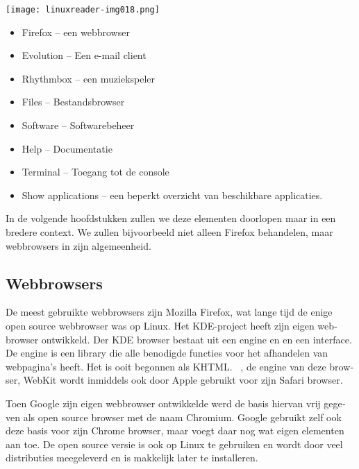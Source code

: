 \begin{center}
\texttt{[image: linuxreader-img018.png]}
\end{center}
\liststyleLi
\begin{itemize}
\item {
Firefox -- een webbrowser}
\item {
Evolution -- Een e-mail client}
\item {
Rhythmbox -- een muziekspeler}
\item {
Files -- Bestandsbrowser}
\item {
Software -- Softwarebeheer}
\item {
Help -- Documentatie}
\item {
Terminal -- Toegang tot de console}
\item {
Show applications -- een beperkt overzicht van beschikbare applicaties.}
\end{itemize}
{
In de volgende hoofdstukken zullen we deze elementen doorlopen maar in een bredere context. We zullen bijvoorbeeld niet
alleen Firefox behandelen, maar webbrowsers in zijn algemeenheid.}

\subsection[Webbrowsers]{ Webbrowsers}
\hypertarget{RefHeadingToc21402520829451}{}{
\foreignlanguage{dutch}{De meest gebruikte webbrowsers zijn Mozilla
}\foreignlanguage{dutch}{Firefox}\foreignlanguage{dutch}{, wat lange tijd de enige open source
webbrowser was op Linux. Het KDE-project heeft zijn eigen webbrowser ontwikkeld. Der KDE browser bestaat uit een engine
en en een interface. De engine is een library die alle benodigde functies voor het afhandelen van webpagina's heeft.
Het is ooit begonnen als KHTML. \ , de engine van deze browser,
}\foreignlanguage{dutch}{WebKit}\foreignlanguage{dutch}{ wordt inmiddels ook door Apple gebruikt voor
zijn Safari browser.}}

{
\foreignlanguage{dutch}{Toen Google zijn eigen webbrowser ontwikkelde werd de basis hiervan vrij gegeven als open source
browser met de naam }\foreignlanguage{dutch}{Chromium}\foreignlanguage{dutch}{. Google gebruikt zelf
ook deze basis voor zijn Chrome browser, maar voegt daar nog wat eigen elementen aan toe. De open source versie is ook
op Linux te gebruiken en wordt door veel distributies meegeleverd en is makkelijk later te installeren.}}

